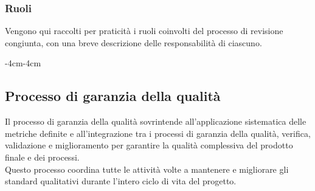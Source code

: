 \documentclass[a4paper,12pt]{article}
\begin{document}
\subsubsection{Ruoli}
Vengono qui raccolti per praticità i ruoli coinvolti del processo di revisione
congiunta, con una breve descrizione delle responsabilità di ciascuno.

\begin{table}[H]
    \begin{adjustwidth}{-4cm}{-4cm}
        \centering
    \end{adjustwidth}
\end{table}

\subsection{Processo di garanzia della qualità}\label{gestione_qualita}
Il processo di garanzia della qualità sovrintende all'applicazione sistematica
delle metriche definite e all'integrazione tra i processi di garanzia della
qualità, verifica, validazione e miglioramento per garantire la qualità
complessiva del prodotto finale e dei processi. \\Questo processo coordina
tutte le attività volte a mantenere e migliorare gli standard qualitativi
durante l'intero ciclo di vita del progetto.
\end{document}
